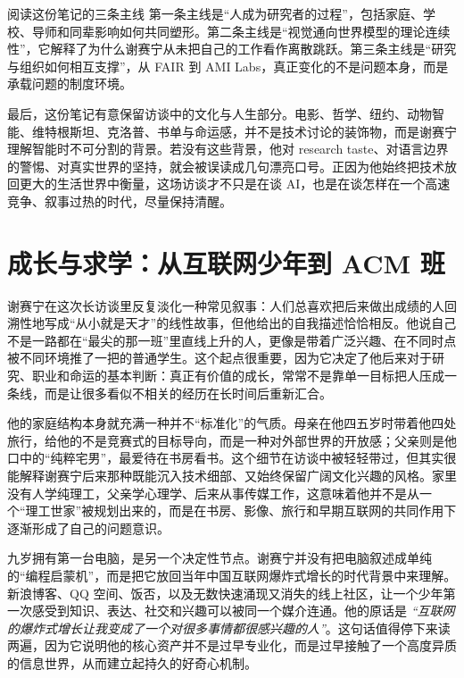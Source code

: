 \documentclass[a4paper,12pt]{article}
\begin{document}
\begin{importantbox}{阅读这份笔记的三条主线}
第一条主线是“人成为研究者的过程”，包括家庭、学校、导师和同辈影响如何共同塑形。第二条主线是“视觉通向世界模型的理论连续性”，它解释了为什么谢赛宁从未把自己的工作看作离散跳跃。第三条主线是“研究与组织如何相互支撑”，从 FAIR 到 AMI Labs，真正变化的不是问题本身，而是承载问题的制度环境。
\end{importantbox}

最后，这份笔记有意保留访谈中的文化与人生部分。电影、哲学、纽约、动物智能、维特根斯坦、克洛普、书单与命运感，并不是技术讨论的装饰物，而是谢赛宁理解智能时不可分割的背景。若没有这些背景，他对 research taste、对语言边界的警惕、对真实世界的坚持，就会被误读成几句漂亮口号。正因为他始终把技术放回更大的生活世界中衡量，这场访谈才不只是在谈 AI，也是在谈怎样在一个高速竞争、叙事过热的时代，尽量保持清醒。

\section{成长与求学：从互联网少年到 ACM 班}

谢赛宁在这次长访谈里反复淡化一种常见叙事：人们总喜欢把后来做出成绩的人回溯性地写成“从小就是天才”的线性故事，但他给出的自我描述恰恰相反。他说自己不是一路都在“最尖的那一班”里直线上升的人，更像是带着广泛兴趣、在不同时点被不同环境推了一把的普通学生。这个起点很重要，因为它决定了他后来对于研究、职业和命运的基本判断：真正有价值的成长，常常不是靠单一目标把人压成一条线，而是让很多看似不相关的经历在长时间后重新汇合。

他的家庭结构本身就充满一种并不“标准化”的气质。母亲在他四五岁时带着他四处旅行，给他的不是竞赛式的目标导向，而是一种对外部世界的开放感；父亲则是他口中的“纯粹宅男”，最爱待在书房看书。这个细节在访谈中被轻轻带过，但其实很能解释谢赛宁后来那种既能沉入技术细部、又始终保留广阔文化兴趣的风格。家里没有人学纯理工，父亲学心理学、后来从事传媒工作，这意味着他并不是从一个“理工世家”被规划出来的，而是在书房、影像、旅行和早期互联网的共同作用下逐渐形成了自己的问题意识。

九岁拥有第一台电脑，是另一个决定性节点。谢赛宁并没有把电脑叙述成单纯的“编程启蒙机”，而是把它放回当年中国互联网爆炸式增长的时代背景中来理解。新浪博客、QQ 空间、饭否，以及无数快速涌现又消失的线上社区，让一个少年第一次感受到知识、表达、社交和兴趣可以被同一个媒介连通。他的原话是 \textit{``互联网的爆炸式增长让我变成了一个对很多事情都很感兴趣的人''}。这句话值得停下来读两遍，因为它说明他的核心资产并不是过早专业化，而是过早接触了一个高度异质的信息世界，从而建立起持久的好奇心机制。
\end{document}
